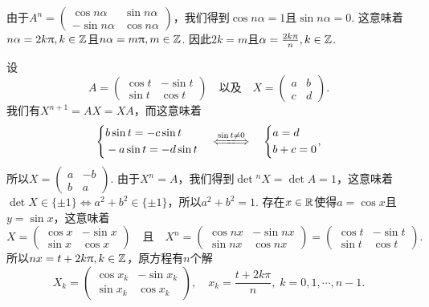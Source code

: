 \begin{solution}
  由于$A^n=\begin{pmatrix}
    \cos n\alpha & \sin n\alpha \\
    -\sin n\alpha & \cos n\alpha
  \end{pmatrix}$，我们得到$\cos n\alpha=1$且$\sin n\alpha=0$. 这意味着$n\alpha=2k\uppi,k\in\mathbb Z$且$n\alpha=m\uppi,m\in\mathbb Z$. 因此$2k=m$且$\alpha=\frac{2k\uppi}n,k\in\mathbb Z$.
\end{solution}

\begin{solution}
  设
  \[
    A = \begin{pmatrix}
      \cos t & - \sin t\\
      \sin t & \cos t
    \end{pmatrix} \quad \text{以及}\quad
    X = \begin{pmatrix}
      a & b \\
      c & d
    \end{pmatrix}.
  \]
  我们有$X^{n+1}=AX=XA$，而这意味着
  \[
    \left\{
      \begin{aligned}
        & b\sin t = -c\sin t \\
        & -a\sin t = -d\sin t
      \end{aligned}
    \right.\quad \xLongleftrightarrow{\sin t\ne0}
    \quad
    \left\{
      \begin{aligned}
        & a = d \\
        & b + c = 0
      \end{aligned}
    \right.,
  \]
  所以$X=\begin{pmatrix}
    a & -b \\
    b & a
  \end{pmatrix}$. 由于$X^n=A$，我们得到$\det{}^nX=\det A=1$，这意味着$\det X\in\{\pm1\}\Leftrightarrow a^2+b^2\in\{\pm1\}$，所以$a^2+b^2=1$. 存在$x\in\mathbb R$使得$a=\cos x$且$y=\sin x$，这意味着
  \[
    X = \begin{pmatrix}
      \cos x & -\sin x\\
      \sin x & \cos x
    \end{pmatrix}\quad \text{且}\quad
    X^n = \begin{pmatrix}
      \cos nx & -\sin nx \\
      \sin nx & \cos nx
    \end{pmatrix} =
    \begin{pmatrix}
      \cos t & - \sin t \\
      \sin t & \cos t
    \end{pmatrix}.
  \]
  所以$nx=t+2k\uppi,k\in\mathbb Z$，原方程有$n$个解
  \[
    X_k = \begin{pmatrix}
      \cos x_k & -\sin x_k \\
      \sin x_k & \cos x_k
    \end{pmatrix},\quad x_k = \frac{t+2k\pi}n,\;
    k=0,1,\cdots,n-1.
  \]
\end{solution}

